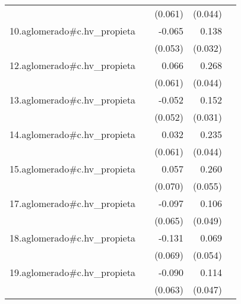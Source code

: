 {\begin{longtable}{l*{4}{D{.}{.}{-1}}}
            &                     &     (0.061)         &     (0.044)         &                     \\
\addlinespace
10.aglomerado#c.hv\_propieta&                     &      -0.065         &       0.138\sym{***}&                     \\
            &                     &     (0.053)         &     (0.032)         &                     \\
\addlinespace
12.aglomerado#c.hv\_propieta&                     &       0.066         &       0.268\sym{***}&                     \\
            &                     &     (0.061)         &     (0.044)         &                     \\
\addlinespace
13.aglomerado#c.hv\_propieta&                     &      -0.052         &       0.152\sym{***}&                     \\
            &                     &     (0.052)         &     (0.031)         &                     \\
\addlinespace
14.aglomerado#c.hv\_propieta&                     &       0.032         &       0.235\sym{***}&                     \\
            &                     &     (0.061)         &     (0.044)         &                     \\
\addlinespace
15.aglomerado#c.hv\_propieta&                     &       0.057         &       0.260\sym{***}&                     \\
            &                     &     (0.070)         &     (0.055)         &                     \\
\addlinespace
17.aglomerado#c.hv\_propieta&                     &      -0.097         &       0.106\sym{*}  &                     \\
            &                     &     (0.065)         &     (0.049)         &                     \\
\addlinespace
18.aglomerado#c.hv\_propieta&                     &      -0.131         &       0.069         &                     \\
            &                     &     (0.069)         &     (0.054)         &                     \\
\addlinespace
19.aglomerado#c.hv\_propieta&                     &      -0.090         &       0.114\sym{*}  &                     \\
            &                     &     (0.063)         &     (0.047)         &                     \\

\end{longtable}}

